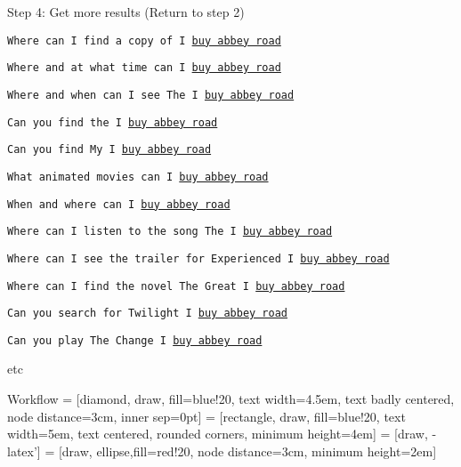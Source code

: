 \documentclass[12pt]{beamer}
\begin{document}
\begin{frame}{Step 4: Get more results (Return to step 2)}

  
\texttt{Where can I find a copy of I \underline{buy abbey road}}

\texttt{Where and at what time can I \underline{buy abbey road}}

\texttt{Where and when can I see The I \underline{buy abbey road}}

\texttt{Can you find the I \underline{buy abbey road}}

\texttt{Can you find My I \underline{buy abbey road}}

\texttt{What animated movies can I \underline{buy abbey road}}

\texttt{When and where can I \underline{buy abbey road}}

\texttt{Where can I listen to the song The I \underline{buy abbey road}}

\texttt{Where can I see the trailer for Experienced I \underline{buy abbey
  road}}

\texttt{Where can I find the novel The Great I \underline{buy abbey road}}

\texttt{Can you search for Twilight I \underline{buy abbey road}}

\texttt{Can you play The Change I \underline{buy abbey road}}


etc

\end{frame}

\begin{frame}{Workflow}
  \centering
 = [diamond, draw, fill=blue!20, 
    text width=4.5em, text badly centered, node distance=3cm, inner sep=0pt]
 = [rectangle, draw, fill=blue!20, 
    text width=5em, text centered, rounded corners, minimum height=4em]
 = [draw, -latex']
 = [draw, ellipse,fill=red!20, node distance=3cm,
    minimum height=2em]
    

  \end{frame}
\end{document}
